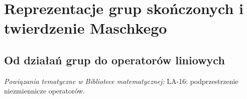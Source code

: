 \chapter{Reprezentacje grup skończonych i twierdzenie Maschkego}

\providecommand{\atlasref}[2]{#2}

\label{aa:ch:representations}
\section{Od działań grup do operatorów liniowych}

\noindent\emph{Powiązania tematyczne w Bibliotece matematycznej:} \atlasref{LA-16::def:lin16-invariant}{LA-16: podprzestrzenie niezmiennicze operatorów}.

